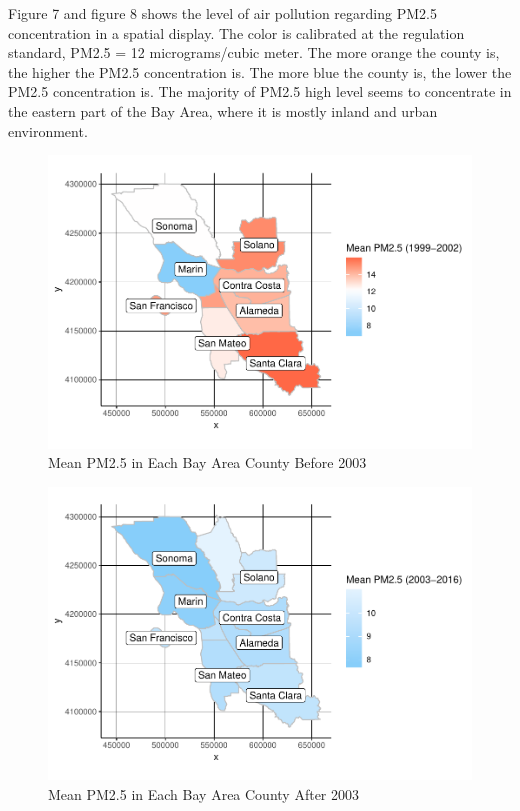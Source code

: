 \documentclass[12pt,]{article}
\begin{document}
Figure 7 and figure 8 shows the level of air pollution regarding PM2.5
concentration in a spatial display. The color is calibrated at the
regulation standard, PM2.5 = 12 micrograms/cubic meter. The more orange
the county is, the higher the PM2.5 concentration is. The more blue the
county is, the lower the PM2.5 concentration is. The majority of PM2.5
high level seems to concentrate in the eastern part of the Bay Area,
where it is mostly inland and urban environment.

\begin{figure}
\centering
\includegraphics{pm25_files/figure-latex/unnamed-chunk-9-1.pdf}
\caption{Mean PM2.5 in Each Bay Area County Before 2003}
\end{figure}

\begin{figure}
\centering
\includegraphics{pm25_files/figure-latex/unnamed-chunk-10-1.pdf}
\caption{Mean PM2.5 in Each Bay Area County After 2003}
\end{figure}
\end{document}
